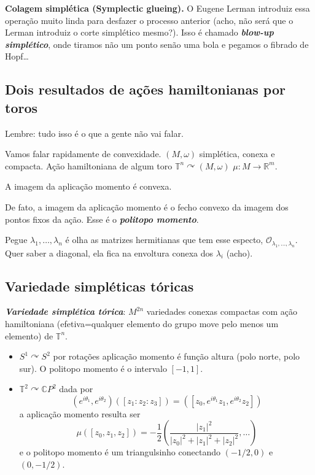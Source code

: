 {\color{1}\bfseries Colagem simplética (Symplectic glueing).}\hspace{.5em} O Eugene Lerman introduiz essa operação muito linda para desfazer o processo anterior (acho, não será que o Lerman introduiz o corte simplético mesmo?). Isso é chamado \textit{\textbf{blow-up simplético}}, onde tiramos não um ponto senão uma bola e pegamos o fibrado de Hopf…

\subsection{Dois resultados de ações hamiltonianas por toros}

Lembre: tudo isso é o que a gente não vai falar.

Vamos falar rapidamente de convexidade. $(M,\omega)$ simplética, conexa e compacta. Ação hamiltoniana de algum toro $\mathbb{T}^n\curvearrowright(M,\omega)$ $\mu:M\to \mathbb{R}^{m}$.

\begin{thm}\leavevmode
	A imagem da aplicação momento é convexa.

	De fato, a imagem da aplicação momento é o fecho convexo da imagem dos pontos fixos da ação. Esse é o \textit{\textbf{politopo momento}}.
\end{thm}

\begin{example}\leavevmode
	Pegue $\lambda_1,\ldots,\lambda_n$ é olha as matrizes hermitianas que tem esse especto, $\mathcal{O}_{\lambda_1,\ldots,\lambda_n}$. Quer saber a diagonal, ela fica na envoltura conexa dos $\lambda_{i}$ (acho).
\end{example}

\subsection{Variedade simpléticas tóricas}

\begin{defn}\leavevmode
\textit{\textbf{Variedade simplética tórica}}: $M^{2n}$ variedades conexas compactas com ação hamiltoniana (efetiva=qualquer elemento do grupo move pelo menos um elemento) de $\mathbb{T}^n$.	
\end{defn}

\begin{example}\leavevmode
\begin{itemize}
	\item $S^1\curvearrowright S^2$ por rotações aplicação momento é função altura (polo norte, polo sur). O politopo momento é o intervalo $[-1,1]$.
\item $\mathbb{T}^2\curvearrowright \mathbb{C}P^{2}$ dada por
	\[(e^{i\theta_1},e^{i\theta_2})([z_1:z_2:z_3])=([z_0,e^{i\theta_1}z_1,e^{i\theta_2}z_2])\]
	a aplicação momento resulta ser
	\[\mu([z_0,z_1,z_2])=-\frac{1}{2}\left( \frac{|z_1|^2}{|z_0|^2+|z_1|^2+|z_2|^2} ,\ldots\right) \]
	e o politopo momento é um triangulsinho conectando $(-1/2,0)$ e  $(0,-1/2)$.
\end{itemize}\end{example}

